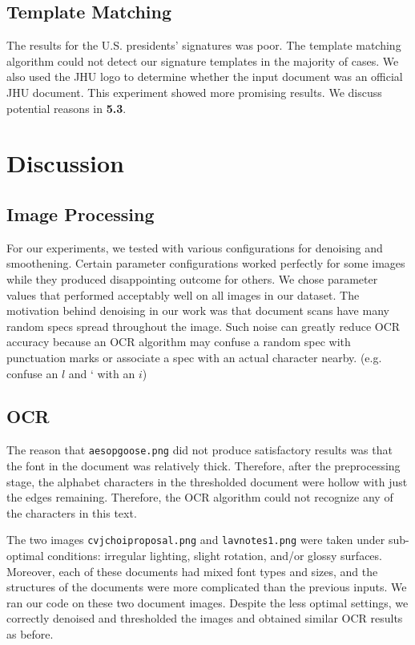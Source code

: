 \documentclass[11pt,letterpaper]{article}
\begin{document}
\subsection{Template Matching}

The results for the U.S. presidents' signatures was poor. The template matching algorithm could not detect our signature templates in the majority of cases. We also used the JHU logo to determine whether the input document was an official JHU document. This experiment showed more promising results. We discuss potential reasons in \textbf{5.3}.

\section{Discussion}

\subsection{Image Processing}

For our experiments, we tested with various configurations for denoising and smoothening. Certain parameter configurations worked perfectly for some images while they produced disappointing outcome for others. We chose parameter values that performed acceptably well on all images in our dataset. The motivation behind denoising in our work was that document scans have many random specs spread throughout the image. Such noise can greatly reduce OCR accuracy because an OCR algorithm may confuse a random spec with punctuation marks or associate a spec with an actual character nearby. (e.g. confuse an $l$ and ` with an $i$)

\subsection{OCR}

The reason that {\tt aesop\textunderscore goose.png} did not produce satisfactory results was that the font in the document was relatively thick. Therefore, after the preprocessing stage, the alphabet characters in the thresholded document were hollow with just the edges remaining. Therefore, the OCR algorithm could not recognize any of the characters in this text.

The two images {\tt cv\textunderscore jchoi\textunderscore proposal.png} and {\tt lav\textunderscore notes1.png} were taken under sub-optimal conditions: irregular lighting, slight rotation, and/or glossy surfaces. Moreover, each of these documents had mixed font types and sizes, and the structures of the documents were more complicated than the previous inputs. We ran our code on these two document images. Despite the less optimal settings, we correctly denoised and thresholded the images and obtained similar OCR results as before.
\end{document}
